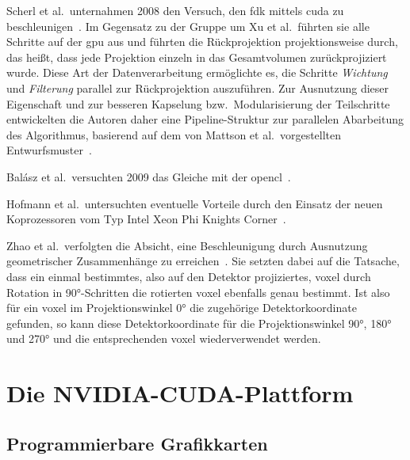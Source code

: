 Scherl et al.\ unternahmen 2008 den Versuch, den \gls{fdk} mittels \gls{cuda} zu beschleunigen~\cite{scherlkeck}. Im
Gegensatz zu der Gruppe um Xu et al.\ führten sie alle Schritte auf der \gls{gpu} aus und führten die Rückprojektion
projektionsweise durch, das heißt, dass jede Projektion einzeln in das Gesamtvolumen zurückprojiziert wurde. Diese Art
der Datenverarbeitung ermöglichte es, die Schritte \textit{Wichtung} und \textit{Filterung} parallel zur Rückprojektion
auszuführen. Zur Ausnutzung dieser Eigenschaft und zur besseren Kapselung bzw.\ Modularisierung der Teilschritte
entwickelten die Autoren daher eine Pipeline-Struktur zur parallelen Abarbeitung des Algorithmus, basierend auf dem von
Mattson et al.\ vorgestellten Entwurfsmuster~\cite{mattsan}.

Balász et al.\ versuchten 2009 das Gleiche mit der \gls{opencl}~\cite{balgab}.

Hofmann et al.\ untersuchten eventuelle Vorteile durch den Einsatz der neuen Koprozessoren vom Typ 
Intel{\textregistered} Xeon Phi{\texttrademark} {\glq}Knights Corner{\grq}~\cite{hoftrei}.

Zhao et al.\ verfolgten die Absicht, eine Beschleunigung durch Ausnutzung geometrischer Zusammenhänge zu
erreichen~\cite{zhao}. Sie setzten dabei auf die Tatsache, dass ein einmal bestimmtes, also auf den Detektor
projiziertes, \gls{voxel} durch Rotation in 90°-Schritten die rotierten \gls{voxel} ebenfalls genau bestimmt. Ist also
für ein \gls{voxel} im Projektionswinkel 0° die zugehörige Detektorkoordinate gefunden, so kann diese Detektorkoordinate
für die Projektionswinkel 90°, 180° und 270° und die entsprechenden \gls{voxel} wiederverwendet werden.

\section{Die NVIDIA{\textregistered}-CUDA{\textregistered}-Plattform}

\subsection{Programmierbare Grafikkarten}\label{ssec:cu_prog_gpu}

